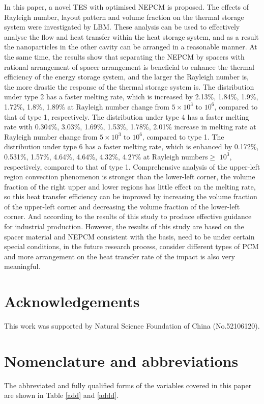 \documentclass[preprint,12pt]{elsarticle}
\begin{document}
In this paper, a novel TES with optimised NEPCM is proposed. The effects of Rayleigh number, layout pattern and volume fraction on the thermal storage system were investigated by LBM. These analysis can be used to effectively analyse the flow and heat transfer within the heat storage system, and as a result the nanoparticles in the other cavity can be arranged in a reasonable manner. At the same time, the results show that separating the NEPCM by spacers with rational arrangement of spacer arrangement is beneficial to enhance the thermal efficiency of the energy storage system, and the larger the Rayleigh number is, the more drastic the response of the thermal storage system is. The distribution under type 2 has a faster melting rate, which is increased by 2.13\%, 1.84\%, 1.9\%, 1.72\%, 1.8\%, 1.89\% at Rayleigh number change from $ 5\times10^3 $ to $ 10^6 $, compared to that of type 1, respectively. The distribution under type 4 has a faster melting rate with 0.304\%, 3.03\%, 1.69\%, 1.53\%, 1.78\%, 2.01\% increase in melting rate at Rayleigh number change from $ 5\times10^3 $ to $ 10^6 $, compared to type 1. The distribution under type 6 has a faster melting rate, which is enhanced by 0.172\%, 0.531\%, 1.57\%, 4.64\%, 4.64\%, 4.32\%, 4.27\% at Rayleigh numbers$ \geqslant $ $ 10^3 $, respectively, compared to that of type 1. Comprehensive analysis of the upper-left region convection phenomenon is stronger than the lower-left corner, the volume fraction of the right upper and lower regions has little effect on the melting rate, so this heat transfer efficiency can be improved by increasing the volume fraction of the upper-left corner and decreasing the volume fraction of the lower-left corner. And according to the results of this study to produce effective guidance for industrial production. However, the results of this study are based on the spacer material and NEPCM consistent with the basis, need to be under certain special conditions, in the future research process, consider different types of PCM and more arrangement on the heat transfer rate of the impact is also very meaningful.

	\section{Acknowledgements}	
This work was supported by Natural Science Foundation of China (No.52106120).
	
	
	
\section{Nomenclature and abbreviations}
The abbreviated and fully qualified forms of the variables covered in this paper are shown in Table \ref{add} and \ref{addd}.
\end{document}
